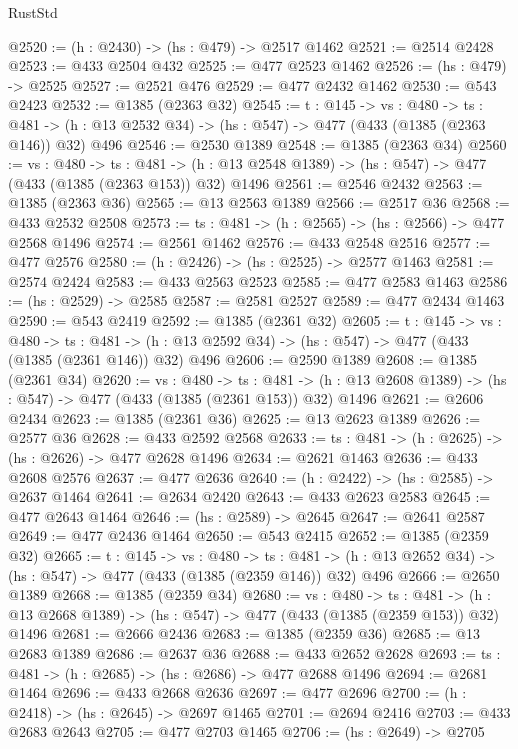 \begin{lexlean}{RustStd}
\begin{coremodule}
{\begin{coremodule}
{{{{{{{@2520 := (h : @2430) -> (hs : @479) -> @2517 @1462
@2521 := @2514 @2428
@2523 := @433 @2504 @432
@2525 := @477 @2523 @1462
@2526 := (hs : @479) -> @2525
@2527 := @2521 @476
@2529 := @477 @2432 @1462
@2530 := @543 @2423
@2532 := @1385 (@2363 @32)
@2545 := {t : @145} ->
  {vs : @480} ->
  {ts : @481} -> (h : @13 @2532 @34) -> (hs : @547) -> @477 (@433 (@1385 (@2363 @146)) @32) @496
@2546 := @2530 @1389
@2548 := @1385 (@2363 @34)
@2560 := {vs : @480} ->
  {ts : @481} -> (h : @13 @2548 @1389) -> (hs : @547) -> @477 (@433 (@1385 (@2363 @153)) @32) @1496
@2561 := @2546 @2432
@2563 := @1385 (@2363 @36)
@2565 := @13 @2563 @1389
@2566 := @2517 @36
@2568 := @433 @2532 @2508
@2573 := {ts : @481} -> (h : @2565) -> (hs : @2566) -> @477 @2568 @1496
@2574 := @2561 @1462
@2576 := @433 @2548 @2516
@2577 := @477 @2576
@2580 := (h : @2426) -> (hs : @2525) -> @2577 @1463
@2581 := @2574 @2424
@2583 := @433 @2563 @2523
@2585 := @477 @2583 @1463
@2586 := (hs : @2529) -> @2585
@2587 := @2581 @2527
@2589 := @477 @2434 @1463
@2590 := @543 @2419
@2592 := @1385 (@2361 @32)
@2605 := {t : @145} ->
  {vs : @480} ->
  {ts : @481} -> (h : @13 @2592 @34) -> (hs : @547) -> @477 (@433 (@1385 (@2361 @146)) @32) @496
@2606 := @2590 @1389
@2608 := @1385 (@2361 @34)
@2620 := {vs : @480} ->
  {ts : @481} -> (h : @13 @2608 @1389) -> (hs : @547) -> @477 (@433 (@1385 (@2361 @153)) @32) @1496
@2621 := @2606 @2434
@2623 := @1385 (@2361 @36)
@2625 := @13 @2623 @1389
@2626 := @2577 @36
@2628 := @433 @2592 @2568
@2633 := {ts : @481} -> (h : @2625) -> (hs : @2626) -> @477 @2628 @1496
@2634 := @2621 @1463
@2636 := @433 @2608 @2576
@2637 := @477 @2636
@2640 := (h : @2422) -> (hs : @2585) -> @2637 @1464
@2641 := @2634 @2420
@2643 := @433 @2623 @2583
@2645 := @477 @2643 @1464
@2646 := (hs : @2589) -> @2645
@2647 := @2641 @2587
@2649 := @477 @2436 @1464
@2650 := @543 @2415
@2652 := @1385 (@2359 @32)
@2665 := {t : @145} ->
  {vs : @480} ->
  {ts : @481} -> (h : @13 @2652 @34) -> (hs : @547) -> @477 (@433 (@1385 (@2359 @146)) @32) @496
@2666 := @2650 @1389
@2668 := @1385 (@2359 @34)
@2680 := {vs : @480} ->
  {ts : @481} -> (h : @13 @2668 @1389) -> (hs : @547) -> @477 (@433 (@1385 (@2359 @153)) @32) @1496
@2681 := @2666 @2436
@2683 := @1385 (@2359 @36)
@2685 := @13 @2683 @1389
@2686 := @2637 @36
@2688 := @433 @2652 @2628
@2693 := {ts : @481} -> (h : @2685) -> (hs : @2686) -> @477 @2688 @1496
@2694 := @2681 @1464
@2696 := @433 @2668 @2636
@2697 := @477 @2696
@2700 := (h : @2418) -> (hs : @2645) -> @2697 @1465
@2701 := @2694 @2416
@2703 := @433 @2683 @2643
@2705 := @477 @2703 @1465
@2706 := (hs : @2649) -> @2705
}}}}}}}
\end{coremodule}}
\end{coremodule}
\end{lexlean}
